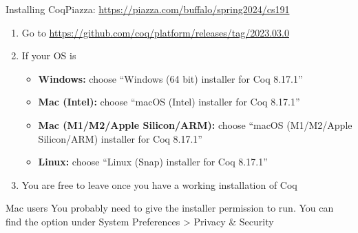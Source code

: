 \documentclass{beamer}
\begin{document}
\begin{frame}{Installing Coq}{Piazza: \href{https://piazza.com/buffalo/spring2024/cs191}{https://piazza.com/buffalo/spring2024/cs191}}
  \begin{enumerate}
  \item Go to \href{https://github.com/coq/platform/releases/tag/2023.03.0}{https://github.com/coq/platform/releases/tag/2023.03.0}
  \item If your OS is
    \begin{itemize}
    \item[] \textbf{Windows:} choose ``Windows (64 bit) installer for Coq 8.17.1''\vspace{1pt}
    \item[] \textbf{Mac (Intel):} choose ``macOS (Intel) installer for Coq 8.17.1''\vspace{1pt}
    \item[] \textbf{Mac (M1/M2/Apple Silicon/ARM):} choose ``macOS (M1/M2/Apple Silicon/ARM) installer for Coq 8.17.1''\vspace{1pt}
    \item[] \textbf{Linux:} choose ``Linux (Snap) installer for Coq 8.17.1''
    \end{itemize}
  \item You are free to leave once you have a working installation of Coq
  \end{enumerate}
  \begin{block}{Mac users}
    You probably need to give the installer permission to run.
    You can find the option under System Preferences > Privacy \& Security
  \end{block}
\end{frame}
\end{document}
